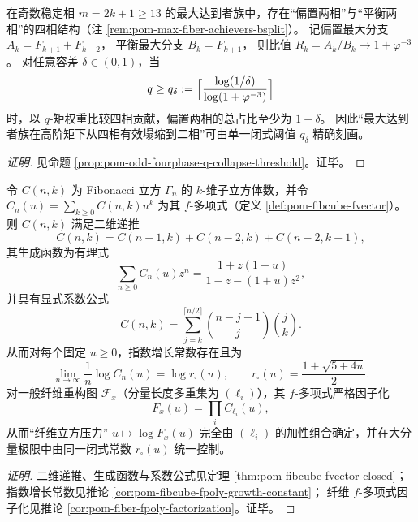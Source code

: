 \begin{conclusion}\label{con:xi-terminal-odd-fourphase-two-phase-collapse-threshold}
在奇数稳定相 \(m=2k+1\ge 13\) 的最大达到者族中，存在“偏置两相”与“平衡两相”的四相结构（注 \ref{rem:pom-max-fiber-achievers-bsplit}）。
记偏置最大分支
\(
A_k=F_{k+1}+F_{k-2}
\)，
平衡最大分支
\(
B_k=F_{k+1}
\)，
则比值 \(R_k=A_k/B_k\to 1+\varphi^{-3}\)。
对任意容差 \(\delta\in(0,1)\)，当
\[
q\ge q_\delta:=\Bigl\lceil \frac{\log(1/\delta)}{\log(1+\varphi^{-3})}\Bigr\rceil
\]
时，以 \(q\)-矩权重比较四相贡献，偏置两相的总占比至少为 \(1-\delta\)。
因此“最大达到者族在高阶矩下从四相有效塌缩到二相”可由单一闭式阈值 \(q_\delta\) 精确刻画。
\end{conclusion}
\begin{proof}[证明]
见命题 \ref{prop:pom-odd-fourphase-q-collapse-threshold}。证毕。
\end{proof}

\begin{conclusion}[时间纤维的立方几何压力：\texorpdfstring{$F_x(u)$}{F_x(u)} 的因子化与增长常数 \texorpdfstring{$r_\square(u)=\frac{1+\sqrt{5+4u}}{2}$}{r_square(u)=(1+sqrt(5+4u))/2}]\label{con:xi-terminal-timefiber-cubical-pressure-factorization}
令 \(C(n,k)\) 为 Fibonacci 立方 \(\Gamma_n\) 的 \(k\)-维子立方体数，并令 \(C_n(u)=\sum_{k\ge 0}C(n,k)u^k\) 为其 \(f\)-多项式（定义 \ref{def:pom-fibcube-fvector}）。
则 \(C(n,k)\) 满足二维递推
\[
C(n,k)=C(n-1,k)+C(n-2,k)+C(n-2,k-1),
\]
其生成函数为有理式
\[
\sum_{n\ge 0}C_n(u)z^n=\frac{1+z(1+u)}{1-z-(1+u)z^2},
\]
并具有显式系数公式
\[
C(n,k)=\sum_{j=k}^{\lceil n/2\rceil}\binom{n-j+1}{j}\binom{j}{k}.
\]
从而对每个固定 \(u\ge 0\)，指数增长常数存在且为
\[
\lim_{n\to\infty}\frac1n\log C_n(u)=\log r_\square(u),\qquad r_\square(u)=\frac{1+\sqrt{5+4u}}{2}.
\]
对一般纤维重构图 \(\mathcal F_x\)（分量长度多重集为 \((\ell_i)\)），其 \(f\)-多项式严格因子化
\[
F_x(u)=\prod_i C_{\ell_i}(u),
\]
从而“纤维立方压力” \(u\mapsto \log F_x(u)\) 完全由 \((\ell_i)\) 的加性组合确定，并在大分量极限中由同一闭式常数 \(r_\square(u)\) 统一控制。
\end{conclusion}
\begin{proof}[证明]
二维递推、生成函数与系数公式见定理 \ref{thm:pom-fibcube-fvector-closed}；
指数增长常数见推论 \ref{cor:pom-fibcube-fpoly-growth-constant}；
纤维 \(f\)-多项式因子化见推论 \ref{cor:pom-fiber-fpoly-factorization}。证毕。
\end{proof}

